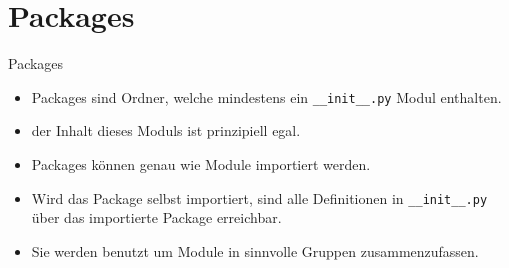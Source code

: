 \section{Packages}
\begin{frame}{Packages}
	\begin{itemize}
		\item Packages sind Ordner, welche mindestens ein \texttt{\_\_init\_\_.py} Modul enthalten.
		\item der Inhalt dieses Moduls ist prinzipiell egal. 
		\item Packages können genau wie Module importiert werden.
		\item Wird das Package selbst importiert, sind alle Definitionen in \texttt{\_\_init\_\_.py} über das importierte Package erreichbar.
		\item Sie werden benutzt um Module in sinnvolle Gruppen zusammenzufassen.
	\end{itemize}
\end{frame}


